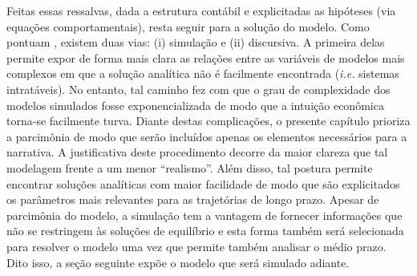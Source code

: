 


Feitas essas ressalvas, dada a estrutura contábil e explicitadas as hipóteses (via equações comportamentais), resta seguir para a solução do modelo. Como pontuam \textcite{caverzasi_stock-flow_2013}, existem duas vias: (i) simulação e (ii) discursiva. A primeira delas permite expor de forma mais clara as relações entre as variáveis de modelos mais complexos em que a solução analítica não é facilmente encontrada (\textit{i.e.} sistemas intratáveis). No entanto, tal caminho fez com que o grau de complexidade dos modelos simulados fosse exponencializada de modo que a intuição econômica torna-se facilmente turva. Diante destas complicações, o presente capítulo prioriza a parcimônia de modo que serão incluídos apenas os elementos necessários para a narrativa. A justificativa deste procedimento decorre da maior clareza que tal modelagem frente a um menor ``realismo''.
Além disso, tal postura permite encontrar soluções analíticas com maior facilidade de modo que são explicitados os parâmetros mais relevantes para as trajetórias de longo prazo. Apesar de parcimônia do modelo, a simulação tem a vantagem
de fornecer informações que não se restringem às soluções de equilíbrio e esta forma
também será selecionada para resolver o modelo uma vez que permite também analisar o médio prazo.
Dito isso, a seção seguinte expõe o modelo que será simulado adiante.
